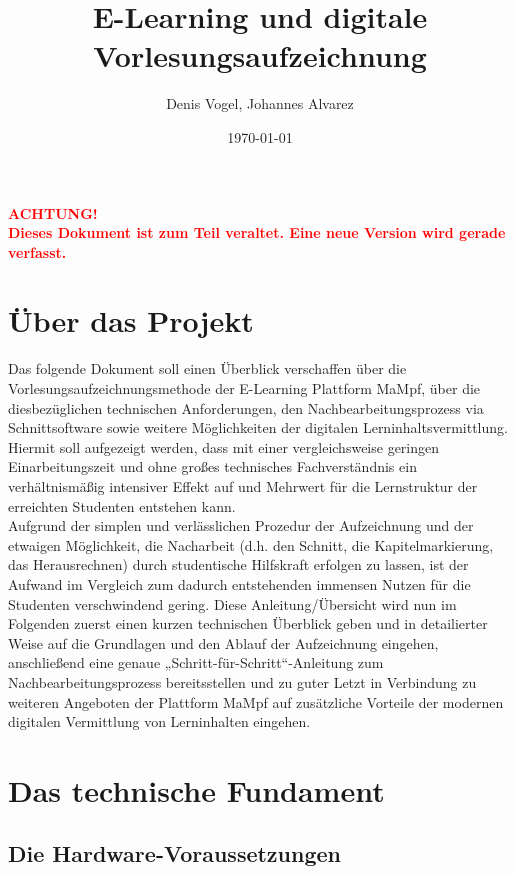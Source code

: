 \documentclass{scrreprt}
\title{E-Learning und digitale Vorlesungsaufzeichnung}
\author{Denis Vogel, Johannes Alvarez}
\date{\today}
\begin{document}


\renewcommand\contentsname{Themen}


\maketitle
\tableofcontents
\newpage

\Huge
\noindent \textbf{\textcolor{red}{ACHTUNG!}}\\
\textbf{\textcolor{red}{Dieses Dokument ist zum Teil veraltet. Eine neue Version wird gerade verfasst.}}

\normalsize

\chapter*{Über das Projekt}
Das folgende Dokument soll einen Überblick verschaffen über die Vorlesungsaufzeichnungsmethode der E-Learning Plattform MaMpf, über die diesbezüglichen technischen Anforderungen, den Nachbearbeitungsprozess via Schnittsoftware sowie weitere Möglichkeiten der digitalen Lerninhaltsvermittlung.
Hiermit soll aufgezeigt werden, dass mit einer vergleichsweise geringen Einarbeitungszeit und ohne großes technisches Fachverständnis ein verhältnismäßig intensiver Effekt auf und Mehrwert für die Lernstruktur der erreichten Studenten entstehen kann.\\
Aufgrund der simplen und verlässlichen Prozedur der Aufzeichnung und der etwaigen Möglichkeit, die Nacharbeit (d.h. den Schnitt, die Kapitelmarkierung, das Herausrechnen) durch studentische Hilfskraft erfolgen zu lassen, ist der Aufwand im Vergleich zum dadurch entstehenden immensen Nutzen für die Studenten verschwindend gering. Diese Anleitung/Übersicht wird nun im Folgenden zuerst einen kurzen technischen Überblick geben und in detailierter Weise auf die Grundlagen und den Ablauf der Aufzeichnung eingehen, anschließend eine genaue „Schritt-für-Schritt“-Anleitung zum Nachbearbeitungsprozess bereitsstellen und zu guter Letzt in Verbindung zu weiteren Angeboten der Plattform MaMpf auf zusätzliche Vorteile der modernen digitalen Vermittlung von Lerninhalten eingehen. 


\chapter{Das technische Fundament}

\section{Die Hardware-Voraussetzungen}
\end{document}

